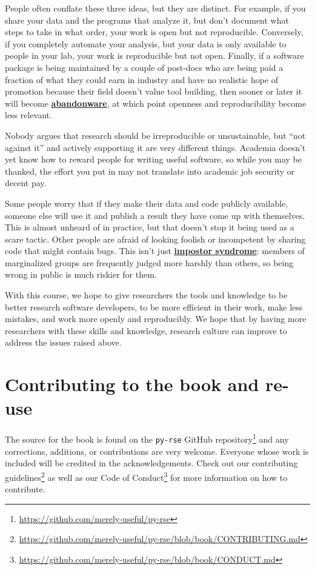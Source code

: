 \documentclass[
]{krantz}
\renewcommand{\href}[2]{#2\footnote{\url{#1}}}
\newcommand{\gref}[2]{\hyperlink{#2}{\textbf{#1}}}
\begin{document}
People often conflate these three ideas,
but they are distinct.
For example,
if you share your data and the programs that analyze it,
but don't document what steps to take in what order,
your work is open but not reproducible.
Conversely,
if you completely automate your analysis,
but your data is only available to people in your lab,
your work is reproducible but not open.
Finally,
if a software package is being maintained by a couple of post-docs
who are being paid a fraction of what they could earn in industry
and have no realistic hope of promotion because their field doesn't value tool building,
then sooner or later it will become \gref{abandonware}{abandonware},
at which point openness and reproducibility become less relevant.

Nobody argues that research should be irreproducible or unsustainable,
but ``not against it'' and actively supporting it are very different things.
Academia doesn't yet know how to reward people for writing useful software,
so while you may be thanked,
the effort you put in may not translate into academic job security or decent pay.

Some people worry that if they make their data and code publicly available,
someone else will use it and publish a result they have come up with themselves.
This is almost unheard of in practice,
but that doesn't stop it being used as a scare tactic.
Other people are afraid of looking foolish or incompetent by sharing code that might contain bugs.
This isn't just \gref{impostor syndrome}{impostor\_syndrome}:
members of marginalized groups are frequently judged more harshly than others,
so being wrong in public is much riskier for them.

With this course, we hope to give researchers the tools and knowledge to be
better research software developers, to be more efficient in their work, make
less mistakes, and work more openly and reproducibly.
We hope that by having more researchers with these skills and knowledge,
research culture can improve to address the issues raised above.

\hypertarget{contributing-to-the-book-and-re-use}{%
\section{Contributing to the book and re-use}\label{contributing-to-the-book-and-re-use}}

The source for the book is found on the \href{https://github.com/merely-useful/py-rse}{\texttt{py-rse} GitHub repository} and
any corrections, additions, or contributions are very welcome.
Everyone whose work is included will be credited in the acknowledgements.
Check out our
\href{https://github.com/merely-useful/py-rse/blob/book/CONTRIBUTING.md}{contributing guidelines}
as well as our
\href{https://github.com/merely-useful/py-rse/blob/book/CONDUCT.md}{Code of Conduct}
for more information on how to contribute.
\end{document}
